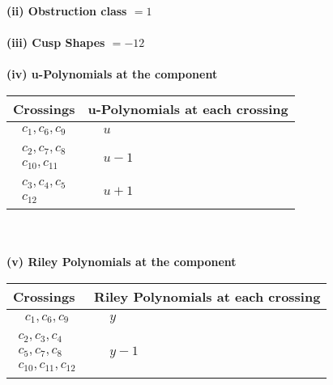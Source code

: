 \documentclass[1p]{elsarticle_modified}
\theoremstyle{definition}
\begin{document}
\flushleft \textbf{(ii) Obstruction class $= 1$}\\~\\
\flushleft \textbf{(iii) Cusp Shapes $= -12$}\\~\\
\newpage\renewcommand{\arraystretch}{1}
\flushleft \textbf{(iv) u-Polynomials at the component}\newline \\
\begin{tabular}{m{50pt}|m{274pt}}
Crossings & \hspace{64pt}u-Polynomials at each crossing \\
\hline $$\begin{aligned}c_{1},c_{6},c_{9}\end{aligned}$$&$\begin{aligned}
&u
\end{aligned}$\\
\hline $$\begin{aligned}c_{2},c_{7},c_{8}\\c_{10},c_{11}\end{aligned}$$&$\begin{aligned}
&u-1
\end{aligned}$\\
\hline $$\begin{aligned}c_{3},c_{4},c_{5}\\c_{12}\end{aligned}$$&$\begin{aligned}
&u+1
\end{aligned}$\\
\hline
\end{tabular}\\~\\
\newpage\renewcommand{\arraystretch}{1}
\flushleft \textbf{(v) Riley Polynomials at the component}\newline \\
\begin{tabular}{m{50pt}|m{274pt}}
Crossings & \hspace{64pt}Riley Polynomials at each crossing \\
\hline $$\begin{aligned}c_{1},c_{6},c_{9}\end{aligned}$$&$\begin{aligned}
&y
\end{aligned}$\\
\hline $$\begin{aligned}c_{2},c_{3},c_{4}\\c_{5},c_{7},c_{8}\\c_{10},c_{11},c_{12}\end{aligned}$$&$\begin{aligned}
&y-1
\end{aligned}$\\
\hline
\end{tabular}\\~\\
\end{document}
